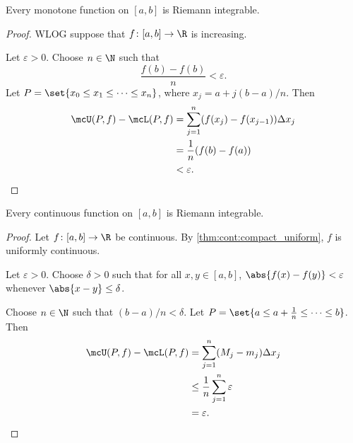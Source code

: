 \begin{exercise}
    Every monotone function on $[a, b]$ is Riemann integrable.
\end{exercise}
\begin{proof}
    WLOG suppose that $f\colon [a, b] \to \R$ is increasing.

    Let $\varepsilon > 0$.
    Choose $n \in \N$ such that \[
        \frac{f(b) - f(b)}{n} < \varepsilon.
    \] Let $P = \set{x_0 \le x_1 \le \dots \le x_n}$, where
    $x_j = a + j(b - a)/n$.
    Then \begin{align*}
        \mcU(P, f) - \mcL(P, f)
            &= \sum_{j=1}^n (f(x_j) - f(x_{j-1})) \Delta x_j \\
            &= \frac1n (f(b) - f(a)) \\
            &< \varepsilon. \qedhere
    \end{align*}
\end{proof}

\begin{exercise}
    Every continuous function on $[a, b]$ is Riemann integrable.
\end{exercise}
\begin{proof}
    Let $f\colon [a, b] \to \R$ be continuous.
    By \cref{thm:cont:compact_uniform}, $f$ is uniformly continuous.

    Let $\varepsilon > 0$.
    Choose $\delta > 0$ such that for all $x, y \in [a, b]$,
    $\abs{f(x) - f(y)} < \varepsilon$ whenever $\abs{x - y} \le \delta$.

    Choose $n \in \N$ such that $(b - a)/n < \delta$.
    Let $P = \set{a \le a + \frac1n \le \dots \le b}$.
    Then \begin{align*}
        \mcU(P, f) - \mcL(P, f)
            &= \sum_{j=1}^n (M_j - m_j) \Delta x_j \\
            &\le \frac1n \sum_{j=1}^n \varepsilon \\
            &= \varepsilon. \qedhere
    \end{align*}
\end{proof}

